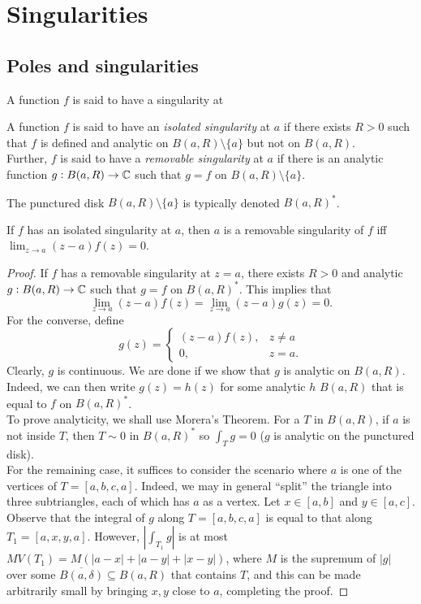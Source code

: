 \section{Singularities}

\subsection{Poles and singularities}

	A function $f$ is said to have a singularity at 

	\begin{fdef}
		A function $f$ is said to have an \emph{isolated singularity} at $a$ if there exists $R > 0$ such that $f$ is defined and analytic on $B(a,R) \setminus \{a\}$ but not on $B(a,R)$.\\
		Further, $f$ is said to have a \emph{removable singularity} at $a$ if there is an analytic function $g : B(a,R) \to \mathbb{C}$ such that $g = f$ on $B(a,R) \setminus \{a\}$.
	\end{fdef}

	The punctured disk $B(a,R) \setminus \{a\}$ is typically denoted $B(a,R)^*$.

	\begin{theorem}
		\label{theo 4.1}
		If $f$ has an isolated singularity at $a$, then $a$ is a removable singularity of $f$ iff $\lim_{z \to a} (z-a) f(z) = 0$.
	\end{theorem}
	\begin{proof}
		If $f$ has a removable singularity at $z = a$, there exists $R > 0$ and analytic $g : B(a,R) \to \mathbb{C}$ such that $g = f$ on $B(a,R)^*$. This implies that
		\[ \lim_{z\to a} (z-a) f(z) = \lim_{z \to a} (z-a) g(z) = 0. \]
		For the converse, define
		\[ g(z) =
		\begin{cases}
			(z-a) f(z), & z \ne a \\
			0, & z=a.	
		\end{cases}
		\]
		Clearly, $g$ is continuous. We are done if we show that $g$ is analytic on $B(a,R)$. Indeed, we can then write $g(z) = h(z)$ for some analytic $h$ $B(a,R)$ that is equal to $f$ on $B(a,R)^*$.\\
		To prove analyticity, we shall use Morera's Theorem. For a $T$ in $B(a,R)$, if $a$ is not inside $T$, then $T \sim 0$ in $B(a,R)^*$ so $\int_T g = 0$ ($g$ is analytic on the punctured disk).\\
		For the remaining case, it suffices to consider the scenario where $a$ is one of the vertices of $T = [a,b,c,a]$. Indeed, we may in general ``split'' the triangle into three subtriangles, each of which has $a$ as a vertex. Let $x \in [a,b]$ and $y \in [a,c]$. Observe that the integral of $g$ along $T = [a,b,c,a]$ is equal to that along $T_1 = [a,x,y,a]$. However, $\left| \int_{T_1} g \right|$ is at most $M V(T_1) = M (|a-x| + |a-y| + |x-y|)$, where $M$ is the supremum of $|g|$ over some $\overline{B(a,\delta)} \subseteq B(a,R)$ that contains $T$, and this can be made arbitrarily small by bringing $x,y$ close to $a$, completing the proof.
	\end{proof}

